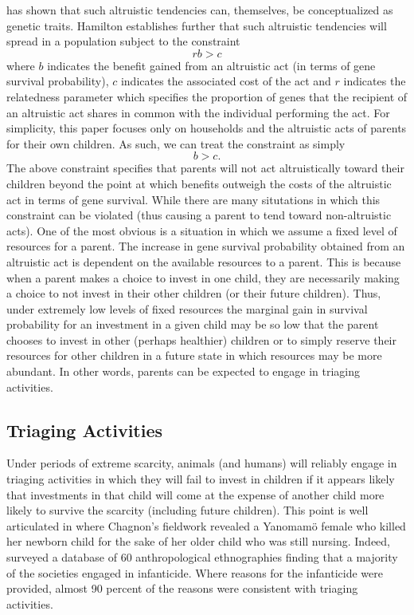 \citet{Hamilton1964} has shown that such altruistic tendencies can, themselves, be conceptualized as genetic traits. Hamilton establishes further that such altruistic tendencies will spread in a population subject to the constraint 
\begin{equation}
rb > c
\end{equation}
where $b$ indicates the benefit gained from an altruistic act (in terms of gene survival probability), $c$ indicates the associated cost of the act and $r$ indicates the relatedness parameter which specifies the proportion of genes that the recipient of an altruistic act shares in common with the individual performing the act. For simplicity, this paper focuses only on households and the altruistic acts of parents for their own children. As such, we can treat the constraint as simply 
\begin{equation}
b > c.
\end{equation}
The above constraint specifies that parents will not act altruistically toward their children beyond the point at which benefits outweigh the costs of the altruistic act in terms of gene survival. While there are many situtations in which this constraint can be violated (thus causing a parent to tend toward non-altruistic acts). One of the most obvious is a situation in which we assume a fixed level of resources for a parent. The increase in gene survival probability obtained from an altruistic act is dependent on the available resources to a parent. This is because when a parent makes a choice to invest in one child, they are necessarily making a choice to not invest in their other children (or their future children). Thus, under extremely low levels of fixed resources the marginal gain in survival probability for an investment in a given child may be so low that the parent chooses to invest in other (perhaps healthier) children or to simply reserve their resources for other children in a future state in which resources may be more abundant. In other words, parents can be expected to engage in triaging activities. 

\subsection{Triaging Activities}

Under periods of extreme scarcity, animals (and humans) will reliably engage in triaging activities in which they will fail to invest in children if it appears likely that investments in that child will come at the expense of another child more likely to survive the scarcity (including future children). This point is well articulated in \citet{Chagnon1983} where Chagnon's fieldwork revealed a Yanomamö female who killed her newborn child for the sake of her older child who was still nursing. Indeed, \citet{Daly1988} surveyed a database of 60 anthropological ethnographies finding that a majority of the societies engaged in infanticide. Where reasons for the infanticide were provided, almost 90 percent of the reasons were consistent with triaging activities.

